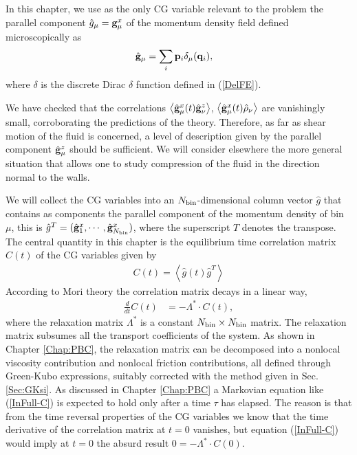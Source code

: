\documentclass[b5paper,openright,10pt]{book}
\newcommand{\esc}{\!\cdot\!}
\newcommand{\llangle}{\left\langle}
\newcommand{\rrangle}{\right\rangle}
\begin{document}
In this chapter,  we use as the only CG  variable relevant to the
problem  the parallel  component  $\hat{g}_\mu={\bf  g}_\mu^x$ of  the
momentum density field defined microscopically as
\begin{align}
\hat{\bf g}_\mu&=\sum_i{\bf p}_i\delta_\mu({\bf q}_i),
\end{align}
where $\delta$ is the discrete Dirac $\delta$ function defined in (\ref{DelFE}).

We   have   checked   that   the   correlations   $\llangle   \hat{\bf
  g}^x_\mu(t)\hat{\bf     g}^z_\nu\rrangle$,    $\llangle     \hat{\bf
  g}^x_\mu(t)\hat{\rho}_\nu\rrangle$     are    vanishingly     small,
corroborating  the predictions  of the  theory. Therefore,  as far  as
shear motion of  the fluid is concerned, a level  of description given
by the  parallel component  $\hat{\bf g}^z _\mu$ should  be sufficient.
We will consider elsewhere the  more general situation that allows one
to  study compression  of the  fluid in  the direction  normal to  the
walls.

We will  collect the  CG variables  into an  $N_{\rm bin}$-dimensional
column  vector  $\hat{g}$ that  contains  as  components the  parallel
component   of  the   momentum   density  of   bin   $\mu$,  this   is
$\hat{g}^T=(\hat{\bf   g}^x_1,\cdots,\hat{\bf  g}^x_{N_{\rm   bin}})$,
where the superscript $T$ denotes the transpose.  The central quantity
in this chapter is the equilibrium time correlation matrix $C(t)$ of the
CG variables given by
\begin{align}
  C(t)=\llangle \hat{g}(t) \hat{g}^T\rrangle
\end{align}
According  to  Mori  theory  the
correlation matrix decays in a linear way,
\begin{align}
 \frac{d}{dt}C(t)&= -\Lambda^*\esc C(t),
\label{InFull-C}
\end{align}
where  the  relaxation  matrix   $\Lambda^*$  is  a  constant  $N_{\rm
  bin}\times N_{\rm  bin}$ matrix. The relaxation  matrix subsumes all
  the transport coefficients  of the system. As shown  in Chapter \ref{Chap:PBC},
the relaxation  matrix can  be decomposed  into a  nonlocal viscosity
contribution and nonlocal friction contributions, all defined through
Green-Kubo expressions,  suitably corrected  with the method  given in
Sec. \ref{Sec:GKsi}.  As discussed in  Chapter \ref{Chap:PBC} a  Markovian equation
like (\ref{InFull-C}) is expected to hold only after a time $\tau$ has
elapsed.  The reason is that from  the time reversal properties of the
CG  variables we  know that  the  time derivative  of the  correlation
matrix at  $t=0$ vanishes,  but equation   (\ref{InFull-C}) would  imply at
$t=0$ the absurd result $0=-\Lambda^*\esc C(0)$.
\end{document}
